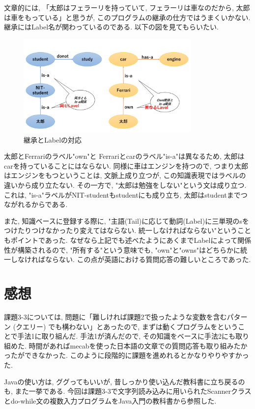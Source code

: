 \documentclass[uplatex,12pt]{jsarticle}
\begin{document}
文章的には, 「太郎はフェラーリを持っていて, フェラーリは車なのだから, 太郎は車をもっている」と思うが, このプログラムの継承の仕方ではうまくいかない. 継承にはLabel名が関わっているのである. 以下の図を見てもらいたい.
\begin{figure}[htbp]
 \begin{center}
  \includegraphics[width = 9cm, pagebox = cropbox, clip]{継承とLabelの対応.pdf}
 \end{center}
 \caption[]{継承とLabelの対応}\label{fig:fig1.1}
\end{figure}

太郎とFerrariのラベル"own"と Ferrariとcarのラベル"is-a"は異なるため, 太郎はcarを持っていることにはならない. 同様に車はエンジンを持つので, つまり太郎はエンジンをもつということは, 文脈上成り立つが, この知識表現ではラベルの違いから成り立たない. その一方で, "太郎は勉強をしない"という文は成り立つ. これは, "is-a"ラベルがNIT-studentもstudentにも成り立ち, 太郎はstudentまでつながれるからである.

また, 知識ベースに登録する際に, "主語(Tail)に応じて動詞(Label)に三単現のsをつけたりつけなかったり変えてはならない. 統一しなければならない"ということもポイントであった. なぜなら上記でも述べたようにあくまでLabelによって関係性が構築されるので, "所有する"という意味でも, "own"と"owns"はどちらかに統一しなければならない. この点が英語における質問応答の難しいところであった.

\section{感想}
課題3-3については, 問題に「難しければ課題2で扱ったような変数を含むパターン (クエリー) でも構わない」とあったので, まずは動くプログラムをということで手法1に取り組んだ. 手法1が済んだので, その知識をベースに手法2にも取り組めた. 時間があればmecabを使った日本語の文章での質問応答も取り組みたかったができなかった. このように段階的に課題を進めれるとかなりやりやすかった.

Javaの使い方は, ググってもいいが, 昔しっかり使い込んだ教科書に立ち戻るのも, また一挙である. 今回は課題3-3で文字列読み込みに用いられたScannerクラスとdo-while文の複数入力プログラムをJava入門の教科書から参照した.
\end{document}
